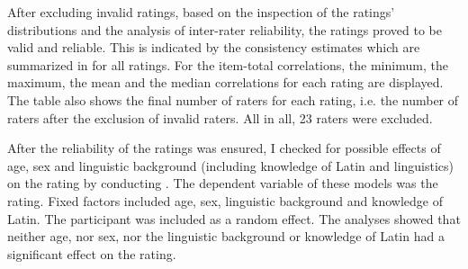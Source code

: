 After excluding invalid ratings, based on the inspection of the ratings' distributions and the analysis of inter-rater reliability, the ratings proved to be valid and reliable. This is indicated by the consistency estimates which are summarized in  for all ratings. For the item-total correlations, the minimum, the maximum, the mean and the median correlations for each rating are displayed. The table also shows the final number of raters for each rating, i.e. the number of raters after the exclusion of invalid raters. All in all, 23 raters were excluded.


\begin{table}
	\caption{Overview consistency estimates for all ratings in corpus study\label{tbl:Overview consistency estimates for all ratings in corpus studys}}
	
\end{table}


\largerpage
After the reliability of the ratings was ensured, I checked for possible effects of age, sex and linguistic background (including knowledge of Latin and linguistics) on the rating by conducting . The dependent variable of these models was the rating. Fixed factors included age, sex, linguistic background and knowledge of Latin. The participant was included as a random effect. The analyses showed that neither age, nor sex,  nor the linguistic background or knowledge of Latin had a significant effect on the rating.

